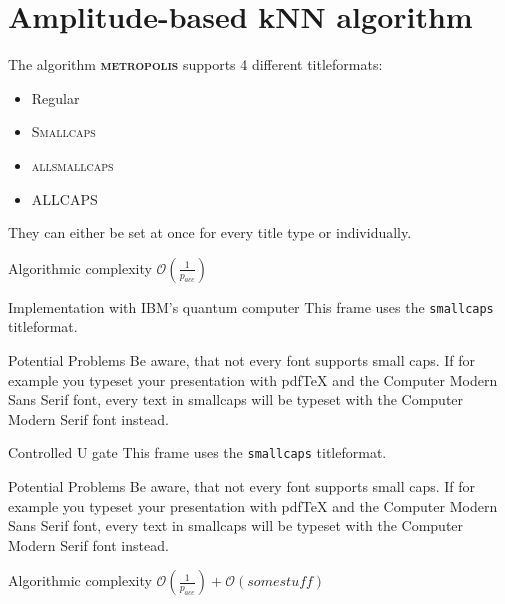 \documentclass[10pt]{beamer}
\newcommand{\themename}{\textbf{\textsc{metropolis}}\xspace}
\begin{document}
\section{Amplitude-based kNN algorithm}
{
\begin{frame}{The algorithm}
	\themename supports 4 different titleformats:
	\begin{itemize}
		\item Regular
		\item \textsc{Smallcaps}
		\item \textsc{allsmallcaps}
		\item ALLCAPS
	\end{itemize}
	They can either be set at once for every title type or individually.
	
	\begin{alertblock}{Algorithmic complexity}
	$\mathcal{O}(\frac{1}{p_{acc}})$
	\end{alertblock}
\end{frame}
}

{
\begin{frame}{Implementation with IBM's quantum computer}
	This frame uses the \texttt{smallcaps} titleformat.

	\begin{alertblock}{Potential Problems}
		Be aware, that not every font supports small caps. If for example you typeset your presentation with pdfTeX and the Computer Modern Sans Serif font, every text in smallcaps will be typeset with the Computer Modern Serif font instead.
	\end{alertblock}
\end{frame}
}

{
\begin{frame}{Controlled U gate}
	This frame uses the \texttt{smallcaps} titleformat.

	\begin{alertblock}{Potential Problems}
		Be aware, that not every font supports small caps. If for example you typeset your presentation with pdfTeX and the Computer Modern Sans Serif font, every text in smallcaps will be typeset with the Computer Modern Serif font instead.
	\end{alertblock}
	
	\begin{alertblock}{Algorithmic complexity}
	$\mathcal{O}(\frac{1}{p_{acc}})+\mathcal{O}(somestuff)$
	\end{alertblock}
\end{frame}

}
\end{document}
